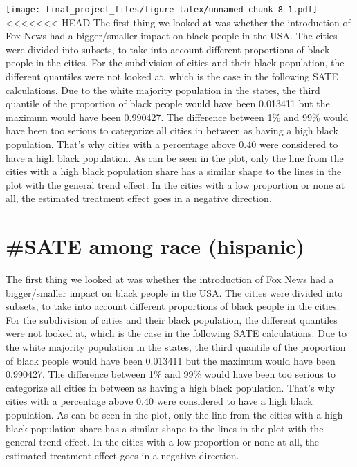 \documentclass[
]{article}
\begin{document}
\texttt{[image: final\_project\_files/figure-latex/unnamed-chunk-8-1.pdf]}
\textless\textless\textless\textless\textless\textless\textless{} HEAD
The first thing we looked at was whether the introduction of Fox News had a bigger/smaller impact on black people in the USA. The cities were divided into subsets, to take into account different proportions of black people in the cities. For the subdivision of cities and their black population, the different quantiles were not looked at, which is the case in the following SATE calculations. Due to the white majority population in the states, the third quantile of the proportion of black people would have been 0.013411 but the maximum would have been 0.990427. The difference between 1\% and 99\% would have been too serious to categorize all cities in between as having a high black population. That's why cities with a percentage above 0.40 were considered to have a high black population. As can be seen in the plot, only the line from the cities with a high black population share has a similar shape to the lines in the plot with the general trend effect. In the cities with a low proportion or none at all, the estimated treatment effect goes in a negative direction.

\hypertarget{sate-among-race-hispanic}{%
\section{\#SATE among race (hispanic)}\label{sate-among-race-hispanic}}

The first thing we looked at was whether the introduction of Fox News had a bigger/smaller impact on black people in the USA. The cities were divided into subsets, to take into account different proportions of black people in the cities. For the subdivision of cities and their black population, the different quantiles were not looked at, which is the case in the following SATE calculations. Due to the white majority population in the states, the third quantile of the proportion of black people would have been 0.013411 but the maximum would have been 0.990427. The difference between 1\% and 99\% would have been too serious to categorize all cities in between as having a high black population. That's why cities with a percentage above 0.40 were considered to have a high black population. As can be seen in the plot, only the line from the cities with a high black population share has a similar shape to the lines in the plot with the general trend effect. In the cities with a low proportion or none at all, the estimated treatment effect goes in a negative direction.
\end{document}
